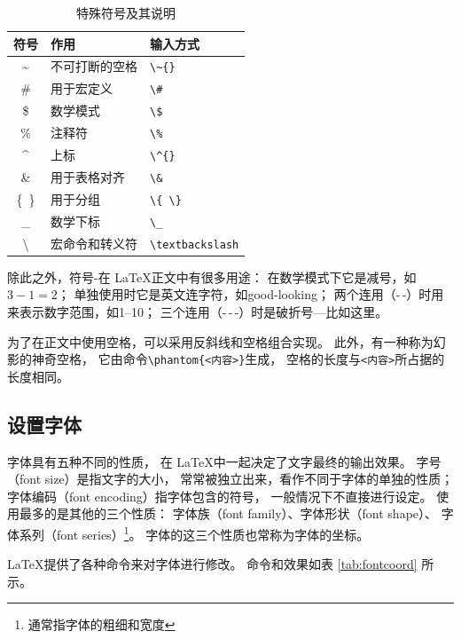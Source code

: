 \documentclass[UTF8]{ctexart}
\numberwithin{equation}{section}			%
\begin{document}
    \begin{table}
        \centering
        \caption{特殊符号及其说明}
        \label{tab:symbol}
        \begin{tabular}{cll}
            \toprule
            符号 & 作用 & 输入方式\\
            \midrule
            \~{} & 不可打断的空格 & \verb|\~{}| \\
            \# & 用于宏定义 & \verb|\#| \\
            \$ & 数学模式 & \verb|\$| \\
            \% & 注释符 & \verb|\%| \\
            \^{} & 上标 & \verb|\^{}| \\
            \& & 用于表格对齐 & \verb|\&| \\
            \{\ \} & 用于分组 & \verb|\{ \}| \\
            \_ & 数学下标 & \verb|\_| \\
            \textbackslash & 宏命令和转义符 & \verb|\textbackslash| \\
            \bottomrule
        \end{tabular}
    \end{table}
    
    除此之外，符号-在 \LaTeX 正文中有很多用途：
    在数学模式下它是减号，如$3-1=2$；
    单独使用时它是英文连字符，如good-looking；
    两个连用（-\,-）时用来表示数字范围，如1--10；
    三个连用（-\,-\,-）时是破折号---比如这里。
    
    为了在正文中使用空格，可以采用反斜线和空格组合实现。
    此外，有一种称为幻影的神奇空格，
    它由命令\verb|\phantom{<内容>}|生成，
    空格的长度与\verb|<内容>|所占据的长度相同。
    
    \subsection{设置字体}
    字体具有五种不同的性质，
    在 \LaTeX 中一起决定了文字最终的输出效果。
    字号（font size）是指文字的大小，
    常常被独立出来，看作不同于字体的单独的性质；
    字体编码（font encoding）指字体包含的符号，
    一般情况下不直接进行设定。
    使用最多的是其他的三个性质：
    字体族（font family）、字体形状（font shape）、
    字体系列（font series）\footnote{通常指字体的粗细和宽度}。
    字体的这三个性质也常称为字体的坐标。
    
    \LaTeX 提供了各种命令来对字体进行修改。
    命令和效果如表 \ref{tab:fontcoord} 所示。
    
\end{document}
